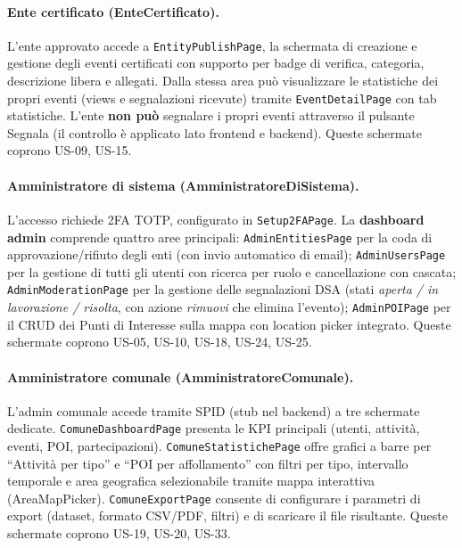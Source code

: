 \documentclass[11pt,a4paper]{article}
\newcommand{\code}[1]{\texttt{\small#1}}
\begin{document}
  \paragraph{Ente certificato (EnteCertificato).}
  L'ente approvato accede a \code{EntityPublishPage}, la schermata di creazione e
  gestione degli eventi certificati con supporto per badge di verifica, categoria,
  descrizione libera e allegati. Dalla stessa area pu\`{o} visualizzare le statistiche
  dei propri eventi (views e segnalazioni ricevute) tramite \code{EventDetailPage} con
  tab statistiche. L'ente \textbf{non pu\`{o}} segnalare i propri eventi attraverso il
  pulsante Segnala (il controllo \`{e} applicato lato frontend e backend).
  Queste schermate coprono US-09, US-15.

  \paragraph{Amministratore di sistema (AmministratoreDiSistema).}
  L'accesso richiede 2FA TOTP, configurato in \code{Setup2FAPage}. La \textbf{dashboard
  admin} comprende quattro aree principali: \code{AdminEntitiesPage} per la
  coda di approvazione/rifiuto degli enti (con invio automatico di email); \code{AdminUsersPage}
  per la gestione di tutti gli utenti con ricerca per ruolo e cancellazione con cascata;
  \code{AdminModerationPage} per la gestione delle segnalazioni DSA (stati
  \emph{aperta / in lavorazione / risolta}, con azione \emph{rimuovi} che elimina l'evento);
  \code{AdminPOIPage} per il CRUD dei Punti di Interesse sulla mappa con location picker
  integrato. Queste schermate coprono US-05, US-10, US-18, US-24, US-25.

  \paragraph{Amministratore comunale (AmministratoreComunale).}
  L'admin comunale accede tramite SPID (stub nel backend) a tre schermate dedicate.
  \code{ComuneDashboardPage} presenta le KPI principali (utenti, attivit\`{a}, eventi,
  POI, partecipazioni). \code{ComuneStatistichePage} offre grafici a barre per
  ``Attivit\`{a} per tipo'' e ``POI per affollamento'' con filtri per tipo, intervallo
  temporale e area geografica selezionabile tramite mappa interattiva (AreaMapPicker).
  \code{ComuneExportPage} consente di configurare i parametri di export (dataset, formato
  CSV/PDF, filtri) e di scaricare il file risultante. Queste schermate coprono
  US-19, US-20, US-33.
\end{document}
